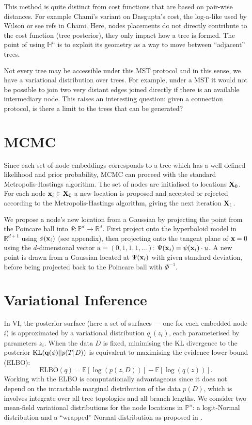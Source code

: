 \documentclass[11pt]{article}
\begin{document}
This method is quite distinct from cost functions that are based on pair-wise distances. For example Chami's variant on Dasgupta's cost, the log-a-like used by Wilson or see refs in Chami. Here, nodes placements do not directly contribute to the cost function (tree posterior), they only impact how a tree is formed. The point of using $\mathbb{H}^{n}$ is to exploit its geometry as a way to move between ``adjacent'' trees.

Not every tree may be accessible under this MST protocol and in this sense, we have a variational distribution over trees.
For example, under a MST it would not be possible to join two very distant edges joined directly if there is an available intermediary node.
This raises an interesting question: given a connection protocol, is there a limit to the trees that can be generated?

\section{MCMC}
Since each set of node embeddings corresponds to a tree which has a well defined likelihood and prior probability, MCMC can proceed with the standard Metropolis-Hastings algorithm.
The set of nodes are initialised to locations $\bold{X}_{0}$.
For each node $\bold{x}_{i} \in \bold{X}_{0}$ a new location is proposed and accepted or rejected according to the Metropolis-Hastings algorithm, giving the next iteration $\bold{X}_{1}$.

We propose a node's new location from a Gaussian by projecting the point from the Poincare ball into $\Psi: \mathbb{P}^{d} \to \mathbb{R}^{d}$.
First project onto the hyperboloid model in $\mathbb{R}^{d+1}$ using $\phi(\bold{x}_{i})$ (see appendix), then projecting onto the tangent plane of $\bold{x}=0$ using the $d$-dimensional vector $u=(0, 1, 1, 1,...)$: $\Psi(\bold{x}_{i}) = \psi(\bold{x}_{i}) \cdot u $.
A new point is drawn from a Gaussian located at $\Psi(\bold{x}_{i})$ with given standard deviation, before being projected back to the Poincare ball with $\Phi^{-1}$.

\section{Variational Inference}
In VI, the posterior surface (here a set of surfaces --- one for each embedded node $i$) is approximated by a variational distribution $q_{i}(z_{i})$, each parameterised by parameters $z_{i}$.
When the data $D$ is fixed, minimising the KL divergence to the posterior $\text{KL}({\bf q}(\phi)||p(T\big|D))$ is equivalent to maximising the evidence lower bound (ELBO):
\begin{equation*}
\text{ELBO}(q) = \mathbb{E}[\log(p(z,D))] - \mathbb{E}[\log(q(z))].
\end{equation*}
Working with the ELBO is computationally advantageous since it does not depend on the intractable marginal distribution of the data $p(D)$, which is involves integrate over all tree topologies and all branch lengths.
We consider two mean-field variational distributions for the node locations in $\mathbb{P}^{n}$: a logit-Normal distribution and a ``wrapped'' Normal distribution as proposed in \cite{Nagano2019Wrapped}.
\end{document}
